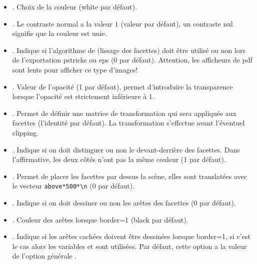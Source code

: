 \begin{itemize}
\begin{itemize}
   \item {}. Choix de la couleur (white par défaut).

   \item {}. Le contraste normal a la valeur $1$ (valeur par défaut), un contraste nul signifie que la couleur est unie.

  \item {}. Indique si l'algorithme de \Gouraud (lissage des facettes) doit être utilisé ou non lors de l'exportation pstricks ou eps (0 par défaut). Attention, les afficheurs de pdf sont lents pour afficher ce type d'images!

   \item {}. Valeur de l'opacité (1 par défaut), permet d'introduire la transparence lorsque l'opacité est strictement inférieure à $1$.

   \item {}. Permet de définir une matrice de transformation qui sera appliquée aux facettes (l'identité par défaut). La transformation s'effectue avant l'éventuel clipping.

   \item {}. Indique si on doit distinguer ou non le devant-derrière des facettes. Dans l'affirmative, les deux côtés n'ont pas la même couleur (1 par défaut).

   \item {}. Permet de placer les facettes par dessus la scène, elles sont translatées avec le vecteur \verb|above*500*\n| ($0$ par défaut).

   \item {}. Indique si on doit dessiner ou non les arêtes des facettes ($0$ par défaut).
   
   \item {}. Couleur des arêtes lorsque \textcolor{\coloropt}{border}=1 (black par défaut).

   \item {}. Indique si les arêtes cachées doivent être dessinées lorsque \textcolor{\coloropt}{border}=1, si c'est le cas alors les variables  et  sont utilisées. Par défaut, cette option a la valeur de l'option générale .
  \end{itemize}
\end{itemize}

